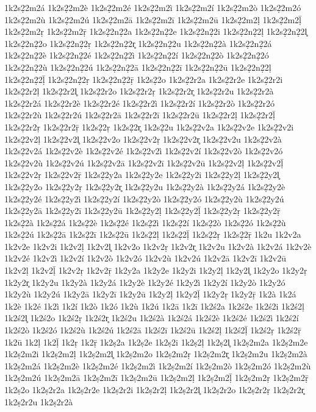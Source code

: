 {1k2s2̣2m2á
1k2s2̣2m2è
1k2s2̣2m2é
1k2s2̣2m2ì
1k2s2̣2m2í
1k2s2̣2m2ò
1k2s2̣2m2ó
1k2s2̣2m2ù
1k2s2̣2m2ú
1k2s2̣2m2ā
1k2s2̣2m2ī
1k2s2̣2m2ū
1k2s2̣2m2ḷ
1k2s2̣2m2ḹ
1k2s2̣2m2ṛ
1k2s2̣2m2ṝ
1k2s2̣2n2̣2a
1k2s2̣2n2̣2e
1k2s2̣2n2̣2i
1k2s2̣2n2̣2ḷ
1k2s2̣2n2̣2l̥
1k2s2̣2n2̣2o
1k2s2̣2n2̣2ṛ
1k2s2̣2n2̣2r̥
1k2s2̣2n2̣2u
1k2s2̣2n2̣2à
1k2s2̣2n2̣2á
1k2s2̣2n2̣2è
1k2s2̣2n2̣2é
1k2s2̣2n2̣2ì
1k2s2̣2n2̣2í
1k2s2̣2n2̣2ò
1k2s2̣2n2̣2ó
1k2s2̣2n2̣2ù
1k2s2̣2n2̣2ú
1k2s2̣2n2̣2ā
1k2s2̣2n2̣2ī
1k2s2̣2n2̣2ū
1k2s2̣2n2̣2ḷ
1k2s2̣2n2̣2ḹ
1k2s2̣2n2̣2ṛ
1k2s2̣2n2̣2ṝ
1k2s2̣2o
1k2s2̣2r2a
1k2s2̣2r2e
1k2s2̣2r2i
1k2s2̣2r2ḷ
1k2s2̣2r2l̥
1k2s2̣2r2o
1k2s2̣2r2ṛ
1k2s2̣2r2r̥
1k2s2̣2r2u
1k2s2̣2r2à
1k2s2̣2r2á
1k2s2̣2r2è
1k2s2̣2r2é
1k2s2̣2r2ì
1k2s2̣2r2í
1k2s2̣2r2ò
1k2s2̣2r2ó
1k2s2̣2r2ù
1k2s2̣2r2ú
1k2s2̣2r2ā
1k2s2̣2r2ī
1k2s2̣2r2ū
1k2s2̣2r2ḷ
1k2s2̣2r2ḹ
1k2s2̣2r2ṛ
1k2s2̣2r2ṝ
1k2s2̣2ṛ
1k2s2̣2r̥
1k2s2̣2u
1k2s2̣2v2a
1k2s2̣2v2e
1k2s2̣2v2i
1k2s2̣2v2ḷ
1k2s2̣2v2l̥
1k2s2̣2v2o
1k2s2̣2v2ṛ
1k2s2̣2v2r̥
1k2s2̣2v2u
1k2s2̣2v2à
1k2s2̣2v2á
1k2s2̣2v2è
1k2s2̣2v2é
1k2s2̣2v2ì
1k2s2̣2v2í
1k2s2̣2v2ò
1k2s2̣2v2ó
1k2s2̣2v2ù
1k2s2̣2v2ú
1k2s2̣2v2ā
1k2s2̣2v2ī
1k2s2̣2v2ū
1k2s2̣2v2ḷ
1k2s2̣2v2ḹ
1k2s2̣2v2ṛ
1k2s2̣2v2ṝ
1k2s2̣2y2a
1k2s2̣2y2e
1k2s2̣2y2i
1k2s2̣2y2ḷ
1k2s2̣2y2l̥
1k2s2̣2y2o
1k2s2̣2y2ṛ
1k2s2̣2y2r̥
1k2s2̣2y2u
1k2s2̣2y2à
1k2s2̣2y2á
1k2s2̣2y2è
1k2s2̣2y2é
1k2s2̣2y2ì
1k2s2̣2y2í
1k2s2̣2y2ò
1k2s2̣2y2ó
1k2s2̣2y2ù
1k2s2̣2y2ú
1k2s2̣2y2ā
1k2s2̣2y2ī
1k2s2̣2y2ū
1k2s2̣2y2ḷ
1k2s2̣2y2ḹ
1k2s2̣2y2ṛ
1k2s2̣2y2ṝ
1k2s2̣2à
1k2s2̣2á
1k2s2̣2è
1k2s2̣2é
1k2s2̣2ì
1k2s2̣2í
1k2s2̣2ò
1k2s2̣2ó
1k2s2̣2ù
1k2s2̣2ú
1k2s2̣2ā
1k2s2̣2ī
1k2s2̣2ū
1k2s2̣2ḷ
1k2s2̣2ḹ
1k2s2̣2ṛ
1k2s2̣2ṝ
1k2u
1k2v2a
1k2v2e
1k2v2i
1k2v2ḷ
1k2v2l̥
1k2v2o
1k2v2ṛ
1k2v2r̥
1k2v2u
1k2v2à
1k2v2á
1k2v2è
1k2v2é
1k2v2ì
1k2v2í
1k2v2ò
1k2v2ó
1k2v2ù
1k2v2ú
1k2v2ā
1k2v2ī
1k2v2ū
1k2v2ḷ
1k2v2ḹ
1k2v2ṛ
1k2v2ṝ
1k2y2a
1k2y2e
1k2y2i
1k2y2ḷ
1k2y2l̥
1k2y2o
1k2y2ṛ
1k2y2r̥
1k2y2u
1k2y2à
1k2y2á
1k2y2è
1k2y2é
1k2y2ì
1k2y2í
1k2y2ò
1k2y2ó
1k2y2ù
1k2y2ú
1k2y2ā
1k2y2ī
1k2y2ū
1k2y2ḷ
1k2y2ḹ
1k2y2ṛ
1k2y2ṝ
1k2à
1k2á
1k2è
1k2é
1k2ì
1k2í
1k2ò
1k2ó
1k2ù
1k2ú
1k2ā
1k2ī
1k2ś2a
1k2ś2e
1k2ś2i
1k2ś2ḷ
1k2ś2l̥
1k2ś2o
1k2ś2ṛ
1k2ś2r̥
1k2ś2u
1k2ś2à
1k2ś2á
1k2ś2è
1k2ś2é
1k2ś2ì
1k2ś2í
1k2ś2ò
1k2ś2ó
1k2ś2ù
1k2ś2ú
1k2ś2ā
1k2ś2ī
1k2ś2ū
1k2ś2ḷ
1k2ś2ḹ
1k2ś2ṛ
1k2ś2ṝ
1k2ū
1k2ḷ
1k2ḹ
1k2ṛ
1k2ṝ
1k2ṣ2a
1k2ṣ2e
1k2ṣ2i
1k2ṣ2ḷ
1k2ṣ2l̥
1k2ṣ2m2a
1k2ṣ2m2e
1k2ṣ2m2i
1k2ṣ2m2ḷ
1k2ṣ2m2l̥
1k2ṣ2m2o
1k2ṣ2m2ṛ
1k2ṣ2m2r̥
1k2ṣ2m2u
1k2ṣ2m2à
1k2ṣ2m2á
1k2ṣ2m2è
1k2ṣ2m2é
1k2ṣ2m2ì
1k2ṣ2m2í
1k2ṣ2m2ò
1k2ṣ2m2ó
1k2ṣ2m2ù
1k2ṣ2m2ú
1k2ṣ2m2ā
1k2ṣ2m2ī
1k2ṣ2m2ū
1k2ṣ2m2ḷ
1k2ṣ2m2ḹ
1k2ṣ2m2ṛ
1k2ṣ2m2ṝ
1k2ṣ2o
1k2ṣ2r2a
1k2ṣ2r2e
1k2ṣ2r2i
1k2ṣ2r2ḷ
1k2ṣ2r2l̥
1k2ṣ2r2o
1k2ṣ2r2ṛ
1k2ṣ2r2r̥
1k2ṣ2r2u
1k2ṣ2r2à
}
